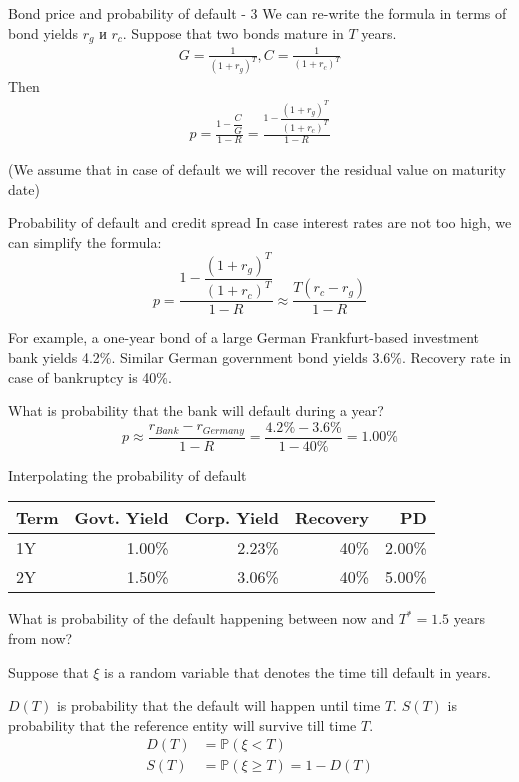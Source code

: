 \documentclass{beamer}
\begin{document}
\begin{frame}{Bond price and probability of default - 3}
\justify
We can re-write the formula in terms of bond yields $r_g$ и $r_c$. Suppose that two bonds mature in $T$ years.
\begin{align*}
G = \frac{1}{(1 + r_g)^T}, C = \frac{1}{(1 + r_c)^T}
\end{align*}
Then
\begin{align*}
p = \frac{1 - \dfrac{C}{G}}{1-R} = \frac{1 - \dfrac{(1 + r_g)^T}{(1 + r_c)^T}}{1 - R}
\end{align*}

\justify
(We assume that in case of default we will recover the residual value on maturity date)
\end{frame}



\begin{frame}{Probability of default and credit spread}
\justify
In case interest rates are not too high, we can simplify the formula:
\begin{equation*}
p = \frac{1 - \dfrac{(1 + r_g)^T}{(1 + r_c)^T}}{1 - R} \approx \frac{T(r_c - r_g)}{1 - R}
\end{equation*}

\justify
For example, a one-year bond of a large German Frankfurt-based investment bank yields 4.2\%. Similar German government bond yields $3.6\%$. Recovery rate in case of bankruptcy is 40\%.

\justify
What is probability that the bank will default during a year?
\begin{equation*}
p \approx \frac{r_{Bank} - r_{Germany}}{1-R} = \frac{4.2\% - 3.6\%}{1-40\%} = 1.00\%
\end{equation*}
\end{frame}



\begin{frame}{Interpolating the probability of default}
\centering
\begin{tabular}{l|r|r|r|r}
Term & Govt. Yield & Corp. Yield & Recovery & PD \\ \hline
1Y & 1.00\% & 2.23\% & 40\% & 2.00\% \\
2Y & 1.50\% & 3.06\% & 40\% & 5.00\%
\end{tabular}

\justify
What is probability of the default happening between now and $T^*=1.5$ years from now?

\justify
Suppose that $\xi$ is a random variable that denotes the time till default in years.

\justify
$D(T)$ is probability that the default will happen until time $T$. $S(T)$ is probability that the reference entity will survive till time $T$.
\begin{align*}
D(T) &= \mathbb{P}(\xi < T) \\
S(T) &= \mathbb{P}(\xi \ge T) = 1 - D(T)
\end{align*}
\end{frame}
 
\end{document}
